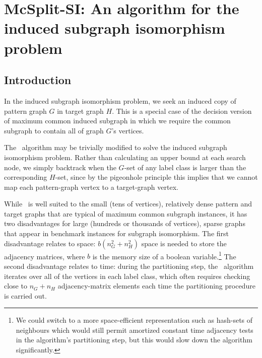 
\newcommand{\varStartG}{\ensuremath{\AlgVar{start}_G}}
\newcommand{\varEndG}{\ensuremath{\AlgVar{end}_G}}
\newcommand{\varStartH}{\ensuremath{\AlgVar{start}_H}}
\newcommand{\varEndH}{\ensuremath{\AlgVar{end}_H}}
\newcommand{\varActive}{\ensuremath{\AlgVar{active}}}
\newcommand{\varSplitting}{\ensuremath{\AlgVar{splitting}}}
\newcommand{\varPrev}{\ensuremath{\AlgVar{prev}}}
\newcommand{\varNext}{\ensuremath{\AlgVar{next}}}
\newcommand{\labelClass}{\ensuremath{\AlgVar{labelClass}}}
\newcommand{\vertexPtr}{\ensuremath{\AlgVar{vertexPtr}}}
\newcommand{\calLC}{\ensuremath{\mathcal{LC}}}
\newcommand{\LC}{\ensuremath{\AlgVar{LC}}}
\newcommand{\Gptrs}{\ensuremath{\AlgVar{Gptrs}}}
\newcommand{\Hptrs}{\ensuremath{\AlgVar{Hptrs}}}
\newcommand{\Garray}{\ensuremath{A_G}}
\newcommand{\Harray}{\ensuremath{A_H}}

\chapter{McSplit-SI: An algorithm for the induced subgraph isomorphism problem}
\label{c:mcsplit-si}

\section{Introduction}

In the induced subgraph isomorphism problem, we seek an induced copy of pattern graph $G$ in target graph $H$. This is a special case of the decision version of maximum common induced subgraph in which we require the common subgraph to contain all of graph $G$'s vertices.

The \McSplit\ algorithm may be trivially modified to solve the induced subgraph isomorphism problem. Rather than calculating an upper bound at each search node, we simply backtrack when the $G$-set of any label class is larger than the corresponding $H$-set, since by the pigeonhole principle this implies that we cannot map each pattern-graph vertex to a target-graph vertex.

While \McSplit\ is well suited to the small (tens of vertices), relatively dense pattern and target graphs that are typical of maximum common subgraph instances, it has two disadvantages for large (hundreds or thousands of vertices), sparse graphs that appear in benchmark instances for subgraph isomorphism.  The first disadvantage relates to space: $b(n_G^2 + n_H^2)$ space is needed to store the adjacency matrices, where $b$ is the memory size of a boolean variable.\footnote{We could switch to a more space-efficient representation such as hash-sets of neighbours which would still permit amortized constant time adjacency tests in the algorithm's partitioning step, but this would slow down the algorithm significantly.}  The second disadvantage relates to time: during the partitioning step, the \McSplit\ algorithm iterates over all of the vertices in each label class, which often requires checking close to $n_G + n_H$ adjacency-matrix elements each time the partitioning procedure is carried out.

